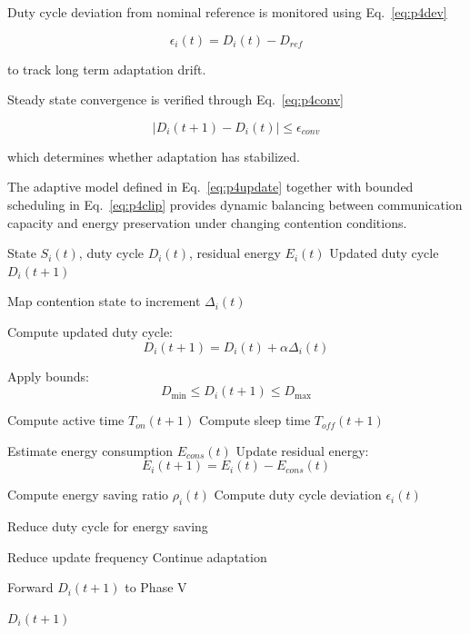 \documentclass[a4paper,fleqn,final,1p]{cas-dc}
\numberwithin{equation}{section}
\begin{document}
Duty cycle deviation from nominal reference is monitored using Eq.~\ref{eq:p4dev}

\begin{equation}
\epsilon_i(t)=
D_i(t)-D_{ref}
\label{eq:p4dev}
\end{equation}

to track long term adaptation drift.

Steady state convergence is verified through Eq.~\ref{eq:p4conv}

\begin{equation}
|D_i(t+1)-D_i(t)|
\le
\epsilon_{conv}
\label{eq:p4conv}
\end{equation}

which determines whether adaptation has stabilized.

The adaptive model defined in Eq.~\ref{eq:p4update} together with bounded scheduling in Eq.~\ref{eq:p4clip} provides dynamic balancing between communication capacity and energy preservation under changing contention conditions.

\begin{algorithm}[H]
\caption{Phase IV: Adaptive Duty Cycle Adjustment}
\label{alg:phase4}
\begin{algorithmic}[1]

\Require State $S_i(t)$, duty cycle $D_i(t)$, residual energy $E_i(t)$
\Ensure Updated duty cycle $D_i(t+1)$

\State Map contention state to increment $\Delta_i(t)$

\State Compute updated duty cycle:
\[
D_i(t+1) = D_i(t) + \alpha \Delta_i(t)
\]

\State Apply bounds:
\[
D_{\min} \le D_i(t+1) \le D_{\max}
\]

\State Compute active time $T_{on}(t+1)$
\State Compute sleep time $T_{off}(t+1)$

\State Estimate energy consumption $E_{cons}(t)$
\State Update residual energy:
\[
E_i(t+1) = E_i(t) - E_{cons}(t)
\]

\State Compute energy saving ratio $\rho_i(t)$
\State Compute duty cycle deviation $\epsilon_i(t)$

\State Reduce duty cycle for energy saving
\EndIf

\State Reduce update frequency
\Else
\State Continue adaptation
\EndIf

\State Forward $D_i(t+1)$ to Phase V

\State \Return $D_i(t+1)$

\end{algorithmic}
\end{algorithm}
\end{document}
